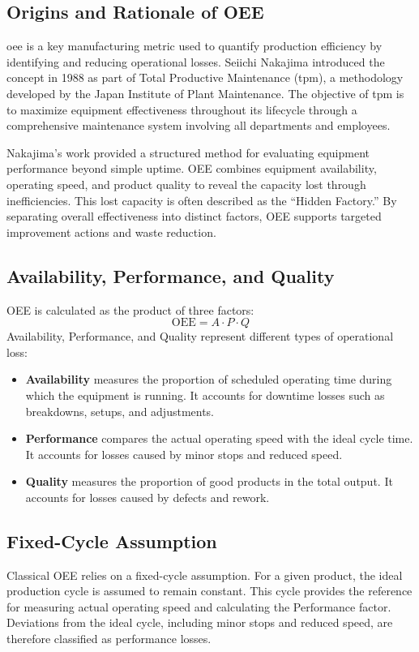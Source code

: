 \subsection{Origins and Rationale of OEE}
 \gls{oee} is a key manufacturing metric used to quantify production efficiency by identifying and reducing operational losses. Seiichi Nakajima introduced the concept in 1988 as part of Total Productive Maintenance (\gls{tpm}), a methodology developed by the Japan Institute of Plant Maintenance.\cite{nakajima1988tpm} The objective of \gls{tpm} is to maximize equipment effectiveness throughout its lifecycle through a comprehensive maintenance system involving all departments and employees.

Nakajima's work provided a structured method for evaluating equipment performance beyond simple uptime. OEE combines equipment availability, operating speed, and product quality to reveal the capacity lost through inefficiencies. This lost capacity is often described as the ``Hidden Factory.'' By separating overall effectiveness into distinct factors, OEE supports targeted improvement actions and waste reduction.
\subsection{Availability, Performance, and Quality}
OEE is calculated as the product of three factors:
\[
\mathrm{OEE} = A \cdot P \cdot Q
\]
Availability, Performance, and Quality represent different types of operational loss:
\begin{itemize}
    \item \textbf{Availability} measures the proportion of scheduled operating time during which the equipment is running. It accounts for downtime losses such as breakdowns, setups, and adjustments.
    \item \textbf{Performance} compares the actual operating speed with the ideal cycle time. It accounts for losses caused by minor stops and reduced speed.
    \item \textbf{Quality} measures the proportion of good products in the total output. It accounts for losses caused by defects and rework.
\end{itemize}
\subsection{Fixed-Cycle Assumption}
Classical OEE relies on a fixed-cycle assumption. For a given product, the ideal production cycle is assumed to remain constant. This cycle provides the reference for measuring actual operating speed and calculating the Performance factor. Deviations from the ideal cycle, including minor stops and reduced speed, are therefore classified as performance losses.

